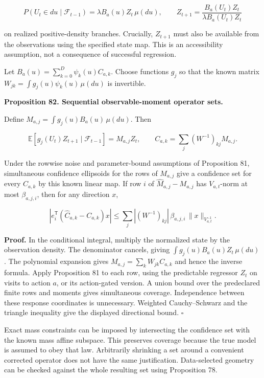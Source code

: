 \documentclass[11pt,letterpaper]{article}
\begin{document}
\[
P(U_t\in du\mid\mathcal F_{t-1})
=\lambda B_a(u)Z_t\,\mu(du),
\qquad
Z_{t+1}=\frac{B_a(U_t)Z_t}{\lambda B_a(U_t)Z_t}
\]

on realized positive-density branches. Crucially, \(Z_{t+1}\) must also
be available from the observations using the specified state map. This
is an accessibility assumption, not a consequence of successful
regression.

Let \(B_a(u)=\sum_{k=0}^{D}\psi_k(u)C_{a,k}\). Choose functions \(g_j\)
so that the known matrix \(W_{jk}=\int g_j(u)\psi_k(u)\,\mu(du)\) is
invertible.

\textbf{Proposition 82. Sequential observable-moment operator sets.}

Define \(M_{a,j}=\int g_j(u)B_a(u)\,\mu(du)\). Then

\[
\boxed{
\mathbb E[g_j(U_t)Z_{t+1}\mid\mathcal F_{t-1}]
=M_{a,j}Z_t,
\qquad
C_{a,k}=\sum_j(W^{-1})_{kj}M_{a,j}.
}
\]

Under the rowwise noise and parameter-bound assumptions of Proposition
81, simultaneous confidence ellipsoids for the rows of \(M_{a,j}\) give
a confidence set for every \(C_{a,k}\) by this known linear map. If row
\(i\) of \(\widehat M_{a,j}-M_{a,j}\) has \(V_{a,t}\)-norm at most
\(\beta_{a,j,i}\), then for any direction \(x\),

\[
\left|e_i^{\mathsf T}(\widehat C_{a,k}-C_{a,k})x\right|
\leq
\sum_j |(W^{-1})_{kj}|\,
\beta_{a,j,i}\,\|x\|_{V_{a,t}^{-1}}.
\]

\textbf{Proof.} In the conditional integral, multiply the normalized
state by the observation density. The denominator cancels, giving
\(\int g_j(u)B_a(u)Z_t\,\mu(du)\). The polynomial expansion gives
\(M_{a,j}=\sum_kW_{jk}C_{a,k}\) and hence the inverse formula. Apply
Proposition 81 to each row, using the predictable regressor \(Z_t\) on
visits to action \(a\), or its action-gated version. A union bound over
the predeclared finite rows and moments gives simultaneous coverage.
Independence between these response coordinates is unnecessary. Weighted
Cauchy--Schwarz and the triangle inequality give the displayed
directional bound. \(\square\)

Exact mass constraints can be imposed by intersecting the confidence set
with the known mass affine subspace. This preserves coverage because the
true model is assumed to obey that law. Arbitrarily shrinking a set
around a convenient corrected operator does not have the same
justification. Data-selected geometry can be checked against the whole
resulting set using Proposition 78.
\end{document}
